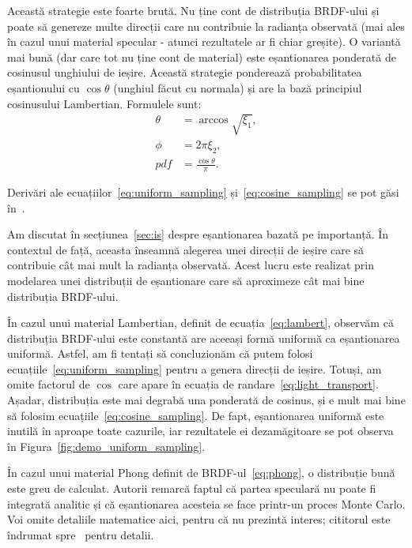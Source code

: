 \documentclass[12pt,a4paper]{report}
\numberwithin{equation}{section} %
\begin{document}
Această strategie este foarte brută. Nu ține cont de distribuția BRDF-ului și
poate să genereze multe direcții care nu contribuie la radianța observată (mai ales
în cazul unui material specular - atunci rezultatele ar fi chiar greșite). O variantă mai bună (dar care tot nu ține cont de material) este eșantionarea ponderată
de cosinusul unghiului de ieșire. Această strategie ponderează probabilitatea
eșantionului cu $\cos \theta$ (unghiul făcut cu normala) și are la bază principiul
cosinusului Lambertian. Formulele sunt:
\begin{equation}\label{eq:cosine_sampling}
	\begin{aligned}
		\theta & = \arccos \sqrt{\xi_1},    \\
		\phi   & = 2\pi \xi_2,              \\
		pdf    & = \frac{\cos \theta}{\pi}.
	\end{aligned}
\end{equation}

Derivări ale ecuațiilor~\ref{eq:uniform_sampling} și~\ref{eq:cosine_sampling} se pot găsi
în~\cite{sampling}.

Am discutat în secțiunea~\ref{sec:is} despre eșantionarea bazată pe importanță.
În contextul de față, aceasta înseamnă alegerea unei direcții de ieșire care să
contribuie cât mai mult la radianța observată. Acest lucru este realizat prin
modelarea unei distribuții de eșantionare care să aproximeze cât mai bine distribuția
BRDF-ului.

În cazul unui material Lambertian, definit de ecuația~\ref{eq:lambert}, observăm
că distribuția BRDF-ului este constantă are aceeași formă uniformă ca eșantionarea
uniformă. Astfel, am fi tentați să concluzionăm că putem folosi
ecuațiile~\ref{eq:uniform_sampling} pentru a genera direcții de ieșire. Totuși,
am omite factorul de $\cos$ care apare în ecuația de randare~\ref{eq:light_transport}.
Așadar, distribuția este mai degrabă una ponderată de cosinus, și e mult mai bine
să folosim ecuațiile~\ref{eq:cosine_sampling}. De fapt, eșantionarea uniformă este
inutilă în aproape toate cazurile, iar rezultatele ei dezamăgitoare se pot
observa în Figura~\ref{fig:demo_uniform_sampling}.

În cazul unui material Phong definit de BRDF-ul~\ref{eq:phong}, o distribuție
bună este greu de calculat. Autorii remarcă faptul că partea speculară nu poate
fi integrată analitic și că eșantionarea acesteia se face printr-un proces
Monte Carlo. Voi omite detaliile matematice aici, pentru că nu prezintă interes;
cititorul este îndrumat spre~\cite{Lafortune} pentru detalii.
\end{document}
